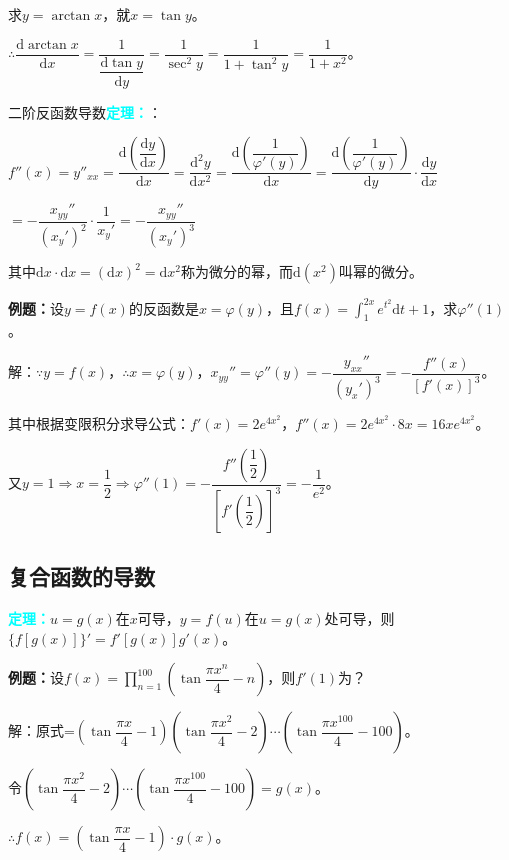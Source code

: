 \documentclass[UTF8, 12pt]{ctexart}
\begin{document}
求$y=\arctan x$，就$x=\tan y$。\medskip

$\therefore\dfrac{\textrm{d}\arctan x}{\textrm{d}x}=\dfrac{1}{\dfrac{\textrm{d}\tan y}{\textrm{d}y}}=\dfrac{1}{\sec^2y}=\dfrac{1}{1+\tan^2y}=\dfrac{1}{1+x^2}$。\medskip

二阶反函数导数\textcolor{aqua}{\textbf{定理：}}：\medskip

$f''(x)=y''_{xx}=\dfrac{\textrm{d}\left(\dfrac{\textrm{d}y}{\textrm{d}x}\right)}{\textrm{d}x}=\dfrac{\textrm{d}^2y}{\textrm{d}x^2}=\dfrac{\textrm{d}\left(\dfrac{1}{\varphi'(y)}\right)}{\textrm{d}x}=\dfrac{\textrm{d}\left(\dfrac{1}{\varphi'(y)}\right)}{\textrm{d}y}\cdot\dfrac{\textrm{d}y}{\textrm{d}x}$

$=-\dfrac{x_{yy}''}{(x_y')^2}\cdot\dfrac{1}{x_y'}=-\dfrac{x_{yy}''}{(x_y')^3}$\medskip

其中$\textrm{d}x\cdot\textrm{d}x=(\textrm{d}x)^2=\textrm{d}x^2$称为微分的幂，而$\textrm{d}(x^2)$叫幂的微分。

\textbf{例题：}设$y=f(x)$的反函数是$x=\varphi(y)$，且$f(x)=\int_1^{2x}e^{t^2}\textrm{d}t+1$，求$\varphi''(1)$。

解：$\because y=f(x)$，$\therefore x=\varphi(y)$，$x_{yy}''=\varphi''(y)=-\dfrac{y_{xx}''}{(y_x')^3}=-\dfrac{f''(x)}{[f'(x)]^3}$。\medskip

其中根据变限积分求导公式：$f'(x)=2e^{4x^2}$，$f''(x)=2e^{4x^2}\cdot 8x=16xe^{4x^2}$。\medskip

又$y=1\Rightarrow x=\dfrac{1}{2}\Rightarrow\varphi''(1)=-\dfrac{f''\left(\dfrac{1}{2}\right)}{\left[f'\left(\dfrac{1}{2}\right)\right]^3}=-\dfrac{1}{e^2}$。

\subsection{复合函数的导数}

\textcolor{aqua}{\textbf{定理：}}$u=g(x)$在$x$可导，$y=f(u)$在$u=g(x)$处可导，则$\{f[g(x)]\}'=f'[g(x)]g'(x)$。

\textbf{例题：}设$f(x)=\prod\limits_{n=1}^{100}\left(\tan\dfrac{\pi x^n}{4}-n\right)$，则$f'(1)$为？

解：原式=$\left(\tan\dfrac{\pi x}{4}-1\right)\left(\tan\dfrac{\pi x^2}{4}-2\right)\cdots\left(\tan\dfrac{\pi x^{100}}{4}-100\right)$。

令$\left(\tan\dfrac{\pi x^2}{4}-2\right)\cdots\left(\tan\dfrac{\pi x^{100}}{4}-100\right)=g(x)$。\medskip

$\therefore f(x)=\left(\tan\dfrac{\pi x}{4}-1\right)\cdot g(x)$。\medskip
\end{document}
